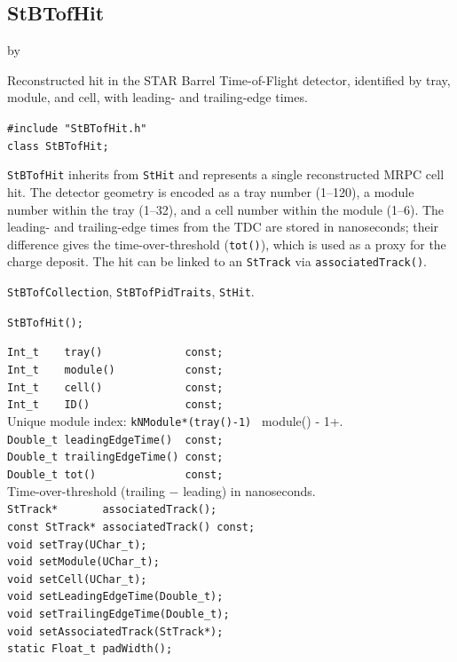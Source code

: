 \documentclass[twoside]{article}
\newcommand{\entrylabel}[1]{\mbox{\textbf{{#1}}}\hfil}%
\newenvironment{entry}
{\begin{list}{}%
    {\renewcommand{\makelabel}{\entrylabel}%
     \setlength{\labelwidth}{90pt}%
     \setlength{\leftmargin}{\labelwidth}
     \advance\leftmargin by \labelsep%
      }%
    }%
  {\end{list}}
\newcommand{\Entrylabel}[1]%
{\raisebox{0pt}[1ex][0pt]{\makebox[\labelwidth][l]%
    {\parbox[t]{\labelwidth}{\hspace{0pt}\textbf{{#1}}}}}}
\newenvironment{Entry}%
{\renewcommand{\entrylabel}{\Entrylabel}\begin{entry}}%
  {\end{entry}}
\begin{document}
\subsection{StBTofHit}
\label{sec:StBTofHit}
\begin{Entry}
\item[Summary] Reconstructed hit in the STAR Barrel Time-of-Flight detector,
    identified by tray, module, and cell, with leading- and trailing-edge times.
\item[Synopsis]
    \verb+#include "StBTofHit.h"+\\
    \verb+class StBTofHit;+\\
\item[Description]
    \texttt{StBTofHit} inherits from \texttt{StHit} and represents a single
    reconstructed MRPC cell hit.  The detector geometry is encoded as a tray
    number (1--120), a module number within the tray (1--32), and a cell number
    within the module (1--6).  The leading- and trailing-edge times from the TDC
    are stored in nanoseconds; their difference gives the time-over-threshold
    (\verb+tot()+), which is used as a proxy for the charge deposit.
    The hit can be linked to an \texttt{StTrack} via \verb+associatedTrack()+.
\item[Related Classes]
    \texttt{StBTofCollection}, \texttt{StBTofPidTraits}, \texttt{StHit}.
\item[Public\\ Constructors]
    \verb+StBTofHit();+\\
\item[Public Member\\ Functions]
    \verb+Int_t    tray()             const;+\\
    \verb+Int_t    module()           const;+\\
    \verb+Int_t    cell()             const;+\\
    \verb+Int_t    ID()               const;+\\
    \quad Unique module index: \verb+kNModule*(tray()-1) + module() - 1+.\\
    \verb+Double_t leadingEdgeTime()  const;+\\
    \verb+Double_t trailingEdgeTime() const;+\\
    \verb+Double_t tot()              const;+\\
    \quad Time-over-threshold (trailing $-$ leading) in nanoseconds.\\
    \verb+StTrack*       associatedTrack();+\\
    \verb+const StTrack* associatedTrack() const;+\\
    \verb+void setTray(UChar_t);+\\
    \verb+void setModule(UChar_t);+\\
    \verb+void setCell(UChar_t);+\\
    \verb+void setLeadingEdgeTime(Double_t);+\\
    \verb+void setTrailingEdgeTime(Double_t);+\\
    \verb+void setAssociatedTrack(StTrack*);+\\
    \verb+static Float_t padWidth();+\\
\end{Entry}
\end{document}

